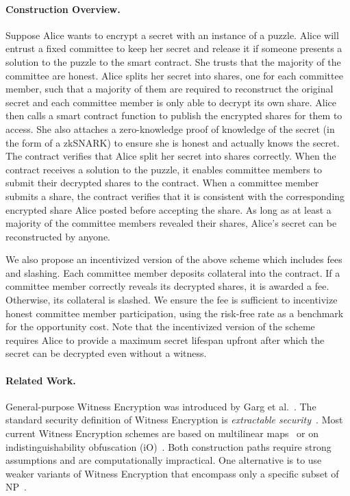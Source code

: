 \paragraph{Construction Overview.}
Suppose Alice wants to encrypt a secret with an instance of a puzzle.
Alice will entrust a fixed committee to keep her secret and release it if someone presents a solution to the puzzle to the smart contract.
She trusts that the majority of the committee are honest.
Alice splits her secret into shares, one for each committee member, such that a majority of them are required to reconstruct the original secret and each committee member is only able to decrypt its own share.
Alice then calls a smart contract function to publish the encrypted shares for them to access.
She also attaches a zero-knowledge proof of knowledge of the secret (in the form of a zkSNARK) to ensure she is honest and actually knows the secret.
The contract verifies that Alice split her secret into shares correctly.
When the contract receives a solution to the puzzle, it enables committee members to submit their decrypted shares to the contract.
When a committee member submits a share, the contract verifies that it is consistent with the corresponding encrypted share Alice posted before accepting the share.
As long as at least a majority of the committee members revealed their shares, Alice's secret can be reconstructed by anyone.

We also propose an incentivized version of the above scheme which includes fees and slashing.
Each committee member deposits collateral into the contract.
If a committee member correctly reveals its decrypted shares, it is awarded a fee.
Otherwise, its collateral is slashed.
We ensure the fee is sufficient to incentivize honest committee member participation, using the risk-free rate as a benchmark for the opportunity cost.
Note that the incentivized version of the scheme requires Alice to provide a maximum secret lifespan upfront after which the secret can be decrypted even without a witness.

\paragraph{Related Work.}
General-purpose Witness Encryption was introduced by Garg et al.~\cite{witness_encryption}.
The standard security definition of Witness Encryption is \emph{extractable security}~\cite{turing_machine_fe}.
Most current Witness Encryption schemes are based on multilinear maps~\cite{witness_encryption,we_multilinear_map} or on indistinguishability obfuscation (iO)~\cite{we_io}. Both construction paths require strong assumptions and are computationally impractical.
One alternative is to use weaker variants of Witness Encryption that encompass only a specific subset of \textsf{NP}~\cite{MrNISC}.

